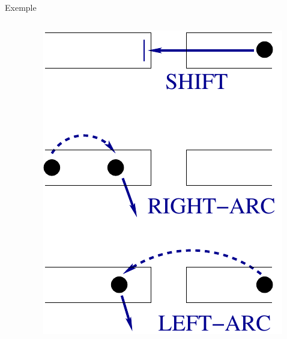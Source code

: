 \documentclass[
	hyperref={unicode},
	xcolor={svgnames, table},
	aspectratio=169,
	french,
]{beamer}
\begin{document}
\begin{frame}{Exemple}
\begin{overlayarea}{\textwidth}{0.8\textheight}
\begin{columns}
\begin{column}{0.65\textwidth}
			\end{column}

		\begin{column}{0.3\textwidth}
				\begin{figure}
						\centering
						\includegraphics[scale=0.45]{images/transitions_b}
				\end{figure}
			\end{column}
		\end{columns}
\end{overlayarea}
\end{frame}
\end{document}
